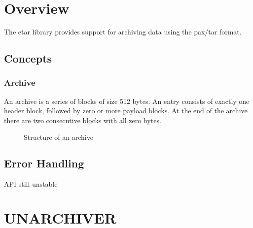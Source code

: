 \documentclass[a4paper]{report}
\begin{document}
\chapter{Overview}
The etar library provides support for archiving data using the pax/tar format.

\section{Concepts}
\subsection{Archive}
An archive is a series of blocks of size 512 bytes. An entry consists of exactly
one header block, followed by zero or more payload blocks. At the end of the
archive there are two consecutive blocks with all zero bytes.

\begin{figure}[h]
	\begin{center}
		
	\end{center}
	\caption{Structure of an archive}
\end{figure}

\section{Error Handling}
API still unstable






\chapter{UNARCHIVER}

\printbibliography[heading=bibintoc]
\end{document}
